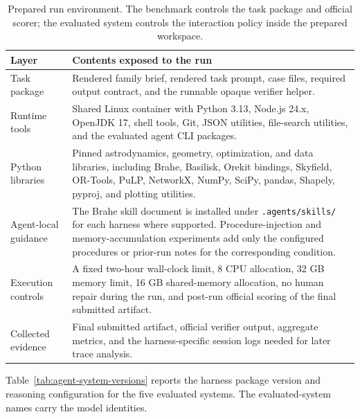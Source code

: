 \documentclass[11pt]{article}
\begin{document}
\begin{table}[!t]
\centering
\footnotesize
\setlength{\tabcolsep}{4pt}
\begin{tabular}{>{\raggedright\arraybackslash}p{}>{\raggedright\arraybackslash}p{}}
\hline
\textbf{Layer} & \textbf{Contents exposed to the run} \\
\hline
Task package & Rendered family brief, rendered task prompt, case files, required output contract, and the runnable opaque verifier helper. \\
Runtime tools & Shared Linux container with Python 3.13, Node.js 24.x, OpenJDK 17, shell tools, Git, JSON utilities, file-search utilities, and the evaluated agent CLI packages. \\
Python libraries & Pinned astrodynamics, geometry, optimization, and data libraries, including Brahe, Basilisk, Orekit bindings, Skyfield, OR-Tools, PuLP, NetworkX, NumPy, SciPy, pandas, Shapely, pyproj, and plotting utilities. \\
Agent-local guidance & The Brahe skill document is installed under \texttt{.agents/skills/} for each harness where supported. Procedure-injection and memory-accumulation experiments add only the configured procedures or prior-run notes for the corresponding condition. \\
Execution controls & A fixed two-hour wall-clock limit, 8 CPU allocation, 32 GB memory limit, 16 GB shared-memory allocation, no human repair during the run, and post-run official scoring of the final submitted artifact. \\
Collected evidence & Final submitted artifact, official verifier output, aggregate metrics, and the harness-specific session logs needed for later trace analysis. \\
\hline
\end{tabular}
\caption{Prepared run environment. The benchmark controls the task package and official scorer; the evaluated system controls the interaction policy inside the prepared workspace.}
\label{tab:workspace-environment}
\end{table}

Table~\ref{tab:agent-system-versions} reports the harness package version and reasoning configuration for the five evaluated systems. The evaluated-system names carry the model identities.
\end{document}
